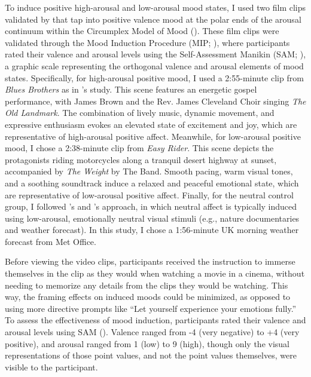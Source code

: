 \documentclass[../MA_Thesis.tex]{subfiles}
\begin{document}
To induce positive high-arousal and low-arousal mood states, I used two film clips validated by \textcite{wensveen_push_2002} that tap into positive valence mood at the polar ends of the arousal continuum within the Circumplex Model of Mood (\cite{feldman_variations_1995}). These film clips were validated through the Mood Induction Procedure (MIP; \cite{lench_discrete_2011}), where participants rated their valence and arousal levels using the Self-Assessment Manikin (SAM; \cite{bradley_affect_1999}), a graphic scale representing the orthogonal valence and arousal elements of mood states. Specifically, for high-arousal positive mood, I used a 2:55-minute clip from \textit{Blues Brothers} as in \cite{wensveen_push_2002}'s study. This scene features an energetic gospel performance, with James Brown and the Rev. James Cleveland Choir singing \textit{The Old Landmark}. The combination of lively music, dynamic movement, and expressive enthusiasm evokes an elevated state of excitement and joy, which are representative of high-arousal positive affect. Meanwhile, for low-arousal positive mood, I chose a 2:38-minute clip from \textit{Easy Rider}. This scene depicts the protagonists riding motorcycles along a tranquil desert highway at sunset, accompanied by \textit{The Weight} by The Band. Smooth pacing, warm visual tones, and a soothing soundtrack induce a relaxed and peaceful emotional state, which are representative of low-arousal positive affect. Finally, for the neutral control group, I followed \textcite{maryam_fakhrhosseini_affectemotion_2017}'s and \textcite{siedlecka_experimental_2019}'s approach, in which neutral affect is typically induced using low-arousal, emotionally neutral visual stimuli (e.g., nature documentaries and weather forecast). In this study, I chose a 1:56-minute UK morning weather forecast from Met Office. 

Before viewing the video clips, participants received the instruction to immerse themselves in the clip as they would when watching a movie in a cinema, without needing to memorize any details from the clips they would be watching. This way, the framing effects on induced moods could be minimized, as opposed to using more directive prompts like ``Let yourself experience your emotions fully.'' To assess the effectiveness of mood induction, participants rated their valence and arousal levels using SAM (\cite{bradley_affect_1999}). Valence ranged from -4 (very negative) to +4 (very positive), and arousal ranged from 1 (low) to 9 (high), though only the visual representations of those point values, and not the point values themselves, were visible to the participant. 
\end{document}

